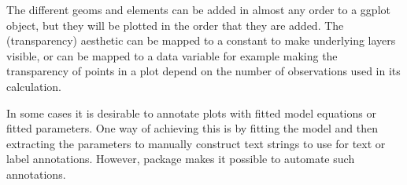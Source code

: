 \documentclass[krantz2]{krantz}\usepackage{knitr}%
\begin{document}
\begin{knitrout}\footnotesize
{}\color{fgcolor}\begin{kframe}
\begin{alltt}
    \hlopt{+}
  \hlstd{()} \hlopt{+}
  \hlstd{(} \hlstd{=} \hlstd{,}
               \hlstd{=} \hlstd{(}  \hlopt{~}  \hlopt{*}  \hlopt{/}  \hlopt{+} 
                                  \hlstd{=} \hlstd{(} \hlstd{=} \hlstd{,}  \hlstd{=} \hlstd{)),}
               \hlstd{=} \hlstd{)}
\end{alltt}
\end{kframe}
\end{knitrout}

\begin{warningbox}
The different geoms and elements can be added in almost any order to a ggplot object, but they will be plotted in the order that they are added. The  (transparency) aesthetic can be mapped to a constant to make underlying layers visible, or  can be mapped to a data variable for example making the transparency of points in a plot depend on the number of observations used in its calculation.

\begin{knitrout}\footnotesize
{}\color{fgcolor}\begin{kframe}
\begin{alltt}
\hlstd{(}  \hlstd{(}     \hlstd{=}  \hlopt{+}
  \hlstd{(} \hlstd{=} \hlstd{,}  \hlstd{=} \hlstd{)} \hlopt{+}
  \hlstd{()} \hlopt{+}
  \hlstd{()}
\end{alltt}
\end{kframe}
\end{knitrout}
\end{warningbox}

In some cases it is desirable to annotate plots with fitted model equations or fitted parameters. One way of achieving this is by fitting the model and then extracting the parameters to manually construct text strings to use for text or label annotations. However, package  makes it possible to automate such annotations.
\end{document}
